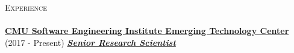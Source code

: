 \documentclass{article}
\newcommand{\lineunder}{\vspace*{-8pt} \\ \hspace*{-18pt} \hrulefill \\}
\newcommand{\header}[1]{{\hspace*{-15pt}\vspace*{6pt} \textsc{#1}} \vspace*{-6pt} \lineunder}
\newcommand{\employer}[3]{{ \textbf{#1} (#2) \underline{\textbf{\emph{#3}}}\\  }}
\begin{document}




\header{\large{Experience}}


\employer{\href{https://www.sei.cmu.edu/about/divisions/emerging-technology-center/}{CMU Software Engineering Institute Emerging Technology Center}}{2017 - Present}{Senior Research Scientist}

\end{document}
